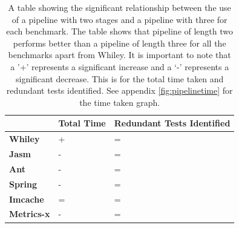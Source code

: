 \begin{table}[h]
\centering
\begin{tabular}{|l|l|l|}
\hline
{\bf }          & {\bf Total Time} & {\bf Redundant Tests Identified} \\ \hline
{\bf Whiley}    & +                & =                           \\ \hline
{\bf Jasm}      & -                & =                           \\ \hline
{\bf Ant}       & -                & =                           \\ \hline
{\bf Spring}    & -                & =                           \\ \hline
{\bf Imcache}   & =                & =                           \\ \hline
{\bf Metrics-x} & -                & =                           \\ \hline
\end{tabular}
\caption[A table showing the significant relationship between the use of a pipeline with two stages and a pipeline with three for each benchmark]{A table showing the significant relationship between the use of a pipeline with two stages and a pipeline with three for each benchmark. The table shows that pipeline of length two performs better than a pipeline of length three for all the benchmarks apart from Whiley. It is important to note that a '+' represents a significant increase and a `-' represents a significant decrease. This is for the total time taken and redundant tests identified. See appendix \ref{fig:pipelinetime} for the time taken graph.}
\label{pipelinesig}
\end{table}

